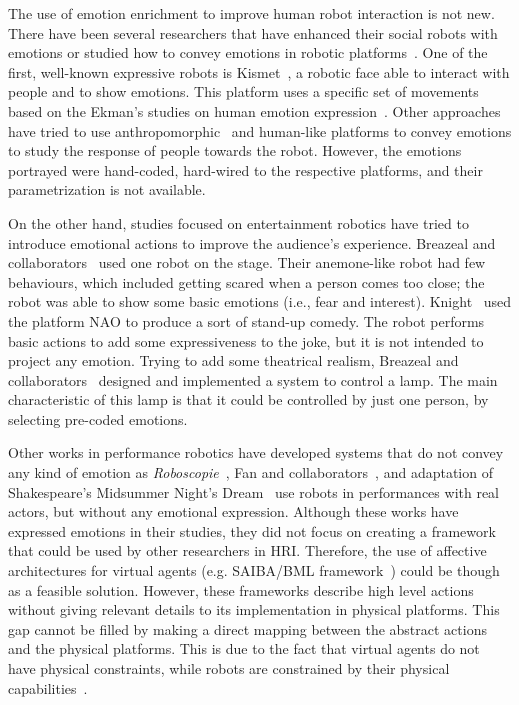 The use of emotion enrichment to improve human robot interaction is not new. There have been several researchers that have enhanced their social robots with emotions or studied how to convey emotions in robotic platforms~\cite{Li2011,Brown2014}. One of the first, well-known expressive robots is Kismet~\cite{Breazeal2002}, a robotic face able to interact with people and to show emotions. This platform uses a specific set of movements based on the Ekman's studies on human emotion expression~\cite{Ekman2004}. Other approaches have tried to use anthropomorphic~\cite{Arras2012} and human-like platforms to convey emotions to study the response of people towards the robot. However, the emotions portrayed were hand-coded, hard-wired to the respective platforms, and their parametrization is not available.

On the other hand, studies focused on entertainment robotics have tried to introduce emotional actions to improve the audience's experience. Breazeal and collaborators~\cite{Breazeal2003} used one robot on the stage. Their anemone-like robot had few behaviours, which included getting scared when a person comes too close; the robot was able to show some basic emotions (i.e., fear and interest). Knight~\cite{Knight2011b} used the platform NAO to produce a sort of stand-up comedy. The robot performs basic actions to add some expressiveness to the joke, but it is not intended to project any emotion. Trying to add some theatrical realism, Breazeal and collaborators~\cite{Breazeal2008} designed and implemented a system to control a lamp. The main characteristic of this lamp is that it could be controlled by just one person, by selecting pre-coded emotions.

Other works in performance robotics have developed systems that do not convey any kind of emotion as \textit{Roboscopie}~\cite{Roboscopie2012}, Fan and collaborators~\cite{Fan2009}, and adaptation of Shakespeare's  Midsummer Night's Dream~\cite{murphy2011} use robots in performances with real actors, but without any emotional expression. Although these works have expressed emotions in their studies, they did not focus on creating a framework that could be used by other researchers in HRI. Therefore, the use of affective architectures for virtual agents (e.g. SAIBA/BML framework~\cite{Kopp2006}) could be though as a feasible solution. However, these frameworks describe high level actions without giving relevant details to its implementation in physical platforms. This gap cannot be filled by making a direct mapping between the abstract actions and the physical platforms. This is due to the fact that virtual agents do not have physical constraints, while robots are constrained by their physical capabilities~\cite{Saerbeck2007,Canamero2010}. 
